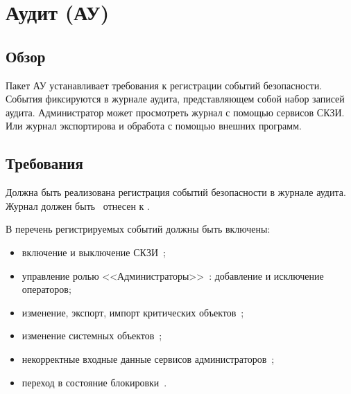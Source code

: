 \section{Аудит (АУ)}\label{AU}

\subsection{Обзор}\label{AU.Defs}

Пакет АУ устанавливает требования к регистрации событий безопасности.
События фиксируются в журнале аудита, представляющем собой набор 
записей аудита.
%
Администратор может просмотреть журнал с помощью сервисов СКЗИ.
Или журнал  экспортирова 
и обработа с помощью внешних программ.

\subsection{Требования}\label{AU.Reqs}


\label{R.AU.Log}
Должна быть реализована регистрация событий безопасности в журнале аудита. 
Журнал должен быть~ отнесен к .

\label{R.AU.Events}
В перечень регистрируемых событий должны быть включены:
\begin{itemize} 
\item
включение и выключение СКЗИ~;
\item
управление ролью <<Администраторы>>~: 
добавление и исключение операторов; 
\item
изменение, экспорт, импорт критических объектов~; 
\item
изменение системных объектов~; 
\item
некорректные входные данные сервисов администраторов~;
\item
переход в состояние блокировки~.
\end{itemize}

\begin{note}
\end{note}

